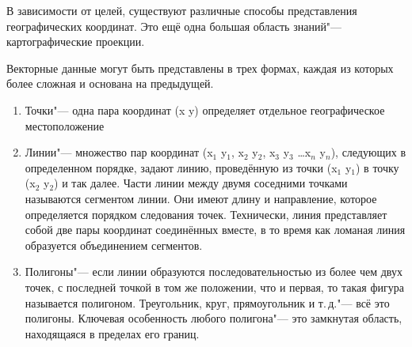 В зависимости от целей, существуют различные способы представления
географических координат. Это ещё одна большая область знаний"---
картографические проекции.

Векторные данные могут быть представлены в трех формах, каждая из которых
более сложная и основана на предыдущей.

\begin{enumerate}
\item Точки"--- одна пара координат (x y) определяет отдельное
географическое местоположение
\item Линии"--- множество пар координат (x$_1$ y$_1$, x$_2$ y$_2$,
x$_3$ y$_3$ \ldots x$_n$ y$_n$), следующих в определенном порядке, задают
линию, проведённую из точки (x$_1$ y$_1$) в точку (x$_2$ y$_2$) и так далее.
Части линии между двумя соседними точками называются сегментом линии. Они
имеют длину и направление, которое определяется порядком следования точек.
Технически, линия представляет собой две пары координат соединённых вместе,
в то время как ломаная линия образуется объединением сегментов.
\item Полигоны"--- если линии образуются последовательностью из более
чем двух точек, с последней точкой в том же положении, что и первая, то
такая фигура называется полигоном. Треугольник, круг, прямоугольник и т.\,д."---
всё это полигоны. Ключевая особенность любого полигона"--- это замкнутая область,
находящаяся в пределах его границ.
\end{enumerate}
